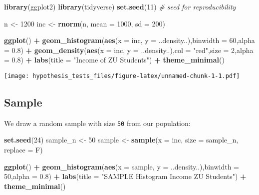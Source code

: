 \documentclass[]{article}
\newenvironment{Shaded}{\begin{snugshade}}{\end{snugshade}}
\newcommand{\KeywordTok}[1]{\textcolor[rgb]{0.13,0.29,0.53}{\textbf{#1}}}
\newcommand{\DataTypeTok}[1]{\textcolor[rgb]{0.13,0.29,0.53}{#1}}
\newcommand{\DecValTok}[1]{\textcolor[rgb]{0.00,0.00,0.81}{#1}}
\newcommand{\FloatTok}[1]{\textcolor[rgb]{0.00,0.00,0.81}{#1}}
\newcommand{\StringTok}[1]{\textcolor[rgb]{0.31,0.60,0.02}{#1}}
\newcommand{\CommentTok}[1]{\textcolor[rgb]{0.56,0.35,0.01}{\textit{#1}}}
\newcommand{\OperatorTok}[1]{\textcolor[rgb]{0.81,0.36,0.00}{\textbf{#1}}}
\newcommand{\NormalTok}[1]{#1}
\begin{document}
\begin{Shaded}
\begin{Highlighting}[]
\KeywordTok{library}\NormalTok{(ggplot2)}
\KeywordTok{library}\NormalTok{(tidyverse)}
\KeywordTok{set.seed}\NormalTok{(}\DecValTok{11}\NormalTok{) }\CommentTok{# seed for reproducibility}

\NormalTok{n <-}\StringTok{ }\DecValTok{1200}
\NormalTok{inc <-}\StringTok{ }\KeywordTok{rnorm}\NormalTok{(n, }\DataTypeTok{mean =} \DecValTok{1000}\NormalTok{, }\DataTypeTok{sd =} \DecValTok{200}\NormalTok{)}

\KeywordTok{ggplot}\NormalTok{() }\OperatorTok{+}
\KeywordTok{geom_histogram}\NormalTok{(}\KeywordTok{aes}\NormalTok{(}\DataTypeTok{x =}\NormalTok{ inc,}
\DataTypeTok{y =}\NormalTok{ ..density..),}\DataTypeTok{binwidth =} \DecValTok{60}\NormalTok{,}\DataTypeTok{alpha =} \FloatTok{0.8}\NormalTok{) }\OperatorTok{+}
\KeywordTok{geom_density}\NormalTok{(}\KeywordTok{aes}\NormalTok{(}\DataTypeTok{x =}\NormalTok{ inc,}
\DataTypeTok{y =}\NormalTok{ ..density..),}\DataTypeTok{col =} \StringTok{"red"}\NormalTok{,}\DataTypeTok{size =} \DecValTok{2}\NormalTok{,}\DataTypeTok{alpha =} \FloatTok{0.8}\NormalTok{) }\OperatorTok{+}
\KeywordTok{labs}\NormalTok{(}\DataTypeTok{title =} \StringTok{"Income of ZU Students"}\NormalTok{) }\OperatorTok{+}
\KeywordTok{theme_minimal}\NormalTok{()}
\end{Highlighting}
\end{Shaded}

\texttt{[image: hypothesis\_tests\_files/figure-latex/unnamed-chunk-1-1.pdf]}

\subsection{Sample}\label{sample}

We draw a random sample with size \texttt{50} from our population:

\begin{Shaded}
\begin{Highlighting}[]
\KeywordTok{set.seed}\NormalTok{(}\DecValTok{24}\NormalTok{)}
\NormalTok{sample_n <-}\StringTok{ }\DecValTok{50}
\NormalTok{sample <-}\StringTok{ }\KeywordTok{sample}\NormalTok{(}\DataTypeTok{x =}\NormalTok{ inc, }\DataTypeTok{size =}\NormalTok{ sample_n, }\DataTypeTok{replace =}\NormalTok{ F)}
\end{Highlighting}
\end{Shaded}

\begin{Shaded}
\begin{Highlighting}[]
\KeywordTok{ggplot}\NormalTok{() }\OperatorTok{+}
\KeywordTok{geom_histogram}\NormalTok{(}\KeywordTok{aes}\NormalTok{(}\DataTypeTok{x =}\NormalTok{ sample,}
\DataTypeTok{y =}\NormalTok{ ..density..),}\DataTypeTok{binwidth =} \DecValTok{50}\NormalTok{,}\DataTypeTok{alpha =} \FloatTok{0.8}\NormalTok{) }\OperatorTok{+}
\KeywordTok{labs}\NormalTok{(}\DataTypeTok{title =} \StringTok{"SAMPLE Histogram Income ZU Students"}\NormalTok{) }\OperatorTok{+}
\KeywordTok{theme_minimal}\NormalTok{()}
\end{Highlighting}
\end{Shaded}
\end{document}
